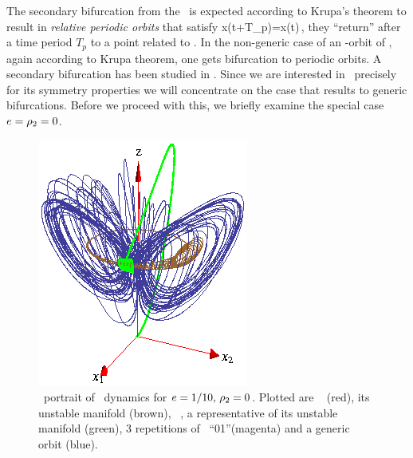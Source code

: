 The secondary bifurcation from the \reqv\ is expected according
to Krupa's theorem to result in
\emph{relative periodic orbits} that satisfy
\beq
	x(t+T_p)=x(t)\,,
\eeq
{\ie} they ``return'' after a time period $T_p$ to a point related to  . In the non-generic case of an
-orbit of \eqva, again according to
Krupa theorem, one gets bifurcation
to periodic orbits. A secondary bifurcation has been
studied in .
Since we are interested in \CLe\
precisely for its symmetry properties we will concentrate on the
case that results to generic bifurcations. Before we proceed
with this, we briefly examine the special case $e=\rho_2=0$.

%
\begin{figure}[ht]
\begin{center}
  \includegraphics[height=0.25\textheight]{../figs/CLE}
\end{center}
\caption[Complex Lorenz flow phase space]
{ \Statesp\ portrait of \CLe\ dynamics for $e=1/10,\,
\rho_2=0$. Plotted are \reqv\  (red), its unstable
manifold (brown), \eqv\ , a representative of its
unstable manifold (green), 3 repetitions of \rpo\
``01''(magenta) and a generic orbit (blue).}
\label{fig:CLE}
\end{figure}
%


